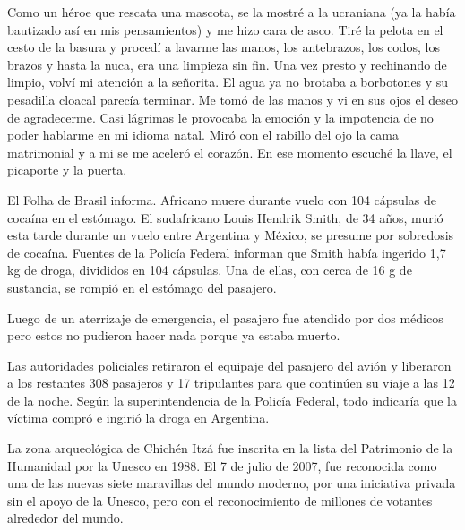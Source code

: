 \documentclass[12pt,twoside,openright,a5paper]{book}
\begin{document}
Como un héroe que rescata una mascota, se la mostré a la ucraniana (ya la
había bautizado así en mis pensamientos) y me hizo cara de asco. Tiré
la pelota en el cesto de la basura y procedí a lavarme las manos, los
antebrazos, los codos, los brazos y hasta la nuca, era una limpieza sin fin.
Una vez presto y rechinando de limpio, volví mi atención a la señorita. El
agua ya no brotaba a borbotones y su pesadilla cloacal parecía terminar.
Me tomó de las manos y vi en sus ojos el deseo de agradecerme. Casi
lágrimas le provocaba la emoción y la impotencia de no poder hablarme en
mi idioma natal. Miró con el rabillo del ojo la cama matrimonial y a mi
se me aceleró el corazón. En ese momento escuché la llave, el picaporte
y la puerta.


\vspace{0.5cm}
\hrulefill\hspace{0.2cm} \decofourleft\decofourright \hspace{0.2cm} \hrulefill
\vspace{0.5cm}

El Folha de Brasil informa. Africano muere
durante vuelo con 104 cápsulas de cocaína en el estómago.  El sudafricano
Louis Hendrik Smith, de 34 años, murió esta tarde durante un vuelo entre
Argentina y México, se presume por sobredosis de cocaína. Fuentes de
la Policía Federal informan que Smith había ingerido 1,7 kg de droga,
divididos en 104 cápsulas. Una de ellas, con cerca de 16 g de sustancia,
se rompió en el estómago del pasajero.

Luego de un aterrizaje de emergencia, el pasajero fue atendido por dos
médicos pero estos no pudieron hacer nada porque ya estaba muerto.

Las autoridades policiales retiraron el equipaje del pasajero del avión y
liberaron a los restantes 308 pasajeros y 17 tripulantes para que continúen
su viaje a las 12 de la noche.  Según la superintendencia de la Policía
Federal, todo indicaría que la víctima compró e ingirió la droga en
Argentina.


\vspace{0.5cm}
\hrulefill\hspace{0.2cm} \decofourleft\decofourright \hspace{0.2cm} \hrulefill
\vspace{0.5cm}

La zona arqueológica de Chichén Itzá fue inscrita en la lista del
Patrimonio de la Humanidad por la Unesco en 1988. El 7 de julio de 2007, fue
reconocida como una de las nuevas siete maravillas del mundo moderno, por
una iniciativa privada sin el apoyo de la Unesco, pero con el reconocimiento
de millones de votantes alrededor del mundo.
\end{document}
